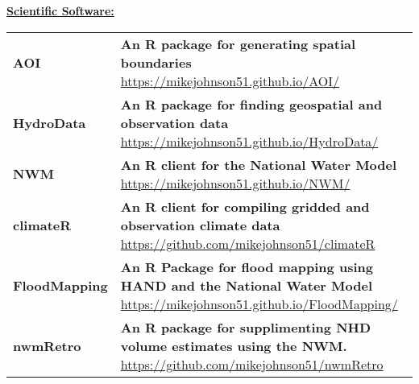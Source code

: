 \documentclass{article}
\newcommand{\header}[1]{\hspace{-5mm}\textcolor{header_blue}{\underline{\textbf{#1}}\\}} %
\newcommand{\blueUrl}[1]{\textcolor{header_blue}{\url{#1}}}
\begin{document}
\vspace{-2mm}
\header{Scientific Software:}
\newline
\vspace{5mm}
\begin{tabular}{p{2.5cm}p{12.0cm}}
  \textbf{AOI } & {\textbf{An R package for generating spatial boundaries} \newline \blueUrl{https://mikejohnson51.github.io/AOI/ }} \\ 
  \textbf{HydroData } & {\textbf{An R package for finding geospatial and observation data} \newline \blueUrl{https://mikejohnson51.github.io/HydroData/ }} \\ 
  \textbf{NWM } & {\textbf{An R client for the National Water Model} \newline \blueUrl{https://mikejohnson51.github.io/NWM/ }} \\ 
  \textbf{climateR } & {\textbf{An R client for compiling gridded and observation climate data} \newline \blueUrl{https://github.com/mikejohnson51/climateR }} \\ 
  \textbf{FloodMapping } & {\textbf{An R Package for flood mapping using HAND and the National Water Model} \newline \blueUrl{https://mikejohnson51.github.io/FloodMapping/ }} \\ 
  \textbf{nwmRetro } & {\textbf{An R package for supplimenting NHD volume estimates using the NWM.} \newline \blueUrl{https://github.com/mikejohnson51/nwmRetro }} \\ 
  \end{tabular}

\end{document}
